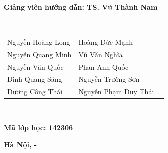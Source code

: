 \documentclass{article}                %
\begin{document}
\begin{titlepage}
	\hspace{2.4cm}
	\begin{minipage}{0.8\textwidth}
		\textbf{Giảng viên hướng dẫn:          TS. Vũ Thành Nam} \\
	\end{minipage} \\

	\hspace{3cm}
	\begin{minipage}{0.7\textwidth}
		\begin{tabular}{l l l}
			Nguyễn Hoàng Long & Hoàng Đức Mạnh       \\
			Nguyễn Quang Minh & Vũ Văn Nghĩa         \\
			Nguyễn Văn Quốc   & Phan Anh Quốc        \\
			Đinh Quang Sáng   & Nguyễn Trường Sơn    \\
			Dương Công Thái   & Nguyễn Phạm Duy Thái \\
		\end{tabular}
	\end{minipage}\\

	\hspace{2.4cm}
	\begin{minipage}{0.8\textwidth}
		\textbf{Mã lớp học: 142306}
	\end{minipage}

	 
	\vspace{0.5cm}
	\begin{center}
		\textbf{Hà Nội,   \the\month- \the\year }
	\end{center}
\end{titlepage}






\end{document}
